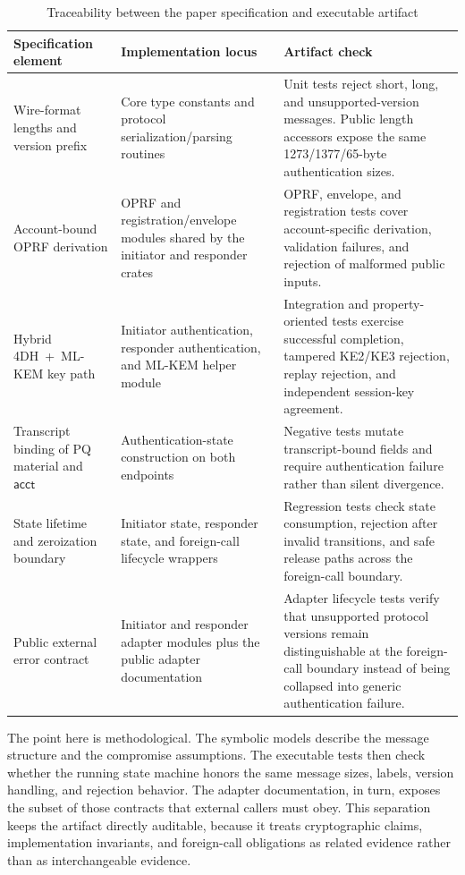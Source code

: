 \documentclass[preprint,12pt]{elsarticle}
\newcommand{\acct}{\mathsf{acct}}
\theoremstyle{remark}
\begin{document}
\begin{table}[htbp]
\caption{Traceability between the paper specification and executable artifact}
\label{tab:traceability}
\centering\scriptsize
\begin{tabularx}{\textwidth}{@{}L{3.0cm}L{4.8cm}X@{}}
\toprule
Specification element & Implementation locus & Artifact check \\
\midrule
Wire-format lengths and version prefix & Core type constants and
protocol serialization/parsing routines & Unit tests reject short,
long, and unsupported-version messages. Public length accessors expose the
same 1273/1377/65-byte authentication sizes. \\
Account-bound OPRF derivation & OPRF and registration/envelope modules
shared by the initiator and responder crates & OPRF, envelope, and registration
tests cover account-specific derivation, validation failures, and
rejection of malformed public inputs. \\
Hybrid 4DH~+~ML-KEM key path & Initiator authentication, responder
authentication, and ML-KEM helper module & Integration and
property-oriented tests exercise successful completion, tampered KE2/KE3
rejection, replay rejection, and independent session-key agreement. \\
Transcript binding of PQ material and $\acct$ & Authentication-state
construction on both endpoints & Negative tests mutate transcript-bound
fields and require authentication failure rather than silent divergence. \\
State lifetime and zeroization boundary & Initiator state, responder state, and
foreign-call lifecycle wrappers & Regression tests check state consumption,
rejection after invalid transitions, and safe release paths across the
foreign-call boundary. \\
Public external error contract & Initiator and responder adapter modules plus the public
adapter documentation & Adapter lifecycle tests verify that unsupported protocol
versions remain distinguishable at the foreign-call boundary instead of being
collapsed into generic authentication failure. \\
\bottomrule
\end{tabularx}
\end{table}

The point here is methodological. The symbolic models describe the
message structure and the compromise assumptions. The executable tests
then check whether the running state machine honors the same message
sizes, labels, version handling, and rejection behavior. The adapter
documentation, in turn, exposes the subset of those contracts that
external callers must obey. This separation keeps the artifact directly
auditable, because it treats cryptographic claims, implementation
invariants, and foreign-call obligations as related evidence rather than
as interchangeable evidence.
\end{document}
